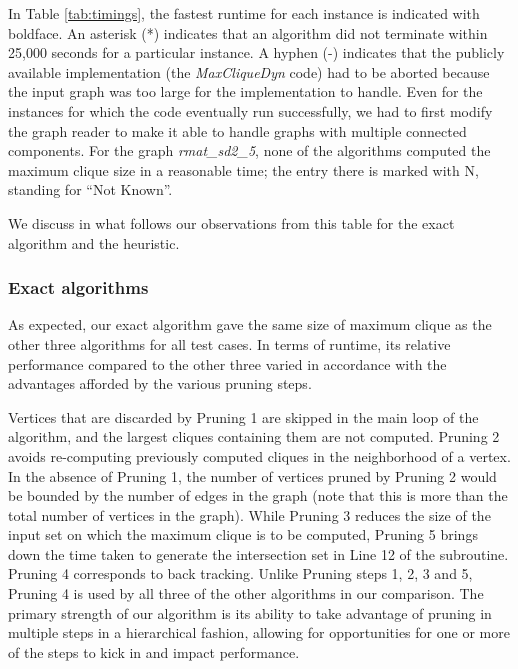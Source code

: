 In Table \ref{tab:timings}, the fastest runtime for each instance is indicated with boldface. 
An asterisk (*) indicates that an algorithm did not terminate within 25,000 seconds for a particular
instance. A hyphen (-) indicates that the publicly available implementation 
(the {\it MaxCliqueDyn} code) had to be aborted because the input graph was too large 
for the implementation to handle. Even for the instances for which the code
eventually run successfully, we had to first modify 
the graph reader to make it able to handle graphs with multiple connected components.
For the graph {\it rmat\_sd2\_5}, none of the algorithms computed the maximum clique size in 
a reasonable time; the entry there is marked with N, standing for  ``Not Known''.

We discuss in what follows our observations from this table
for the exact algorithm and the heuristic.

\subsubsection{Exact algorithms}
\label{sec:exp-exact}

As expected, our exact algorithm gave the same size of maximum clique as the other
three algorithms for all test cases. 
In terms of runtime,  its relative performance compared to the other three varied
in accordance with the advantages afforded by the various pruning steps.  




Vertices that are discarded by Pruning 1 are skipped in the main loop of the algorithm, and the largest cliques containing them are not computed. Pruning 2 avoids re-computing previously computed cliques in the neighborhood of a vertex. In the absence of Pruning 1, the number of vertices pruned by Pruning 2 would be bounded by the number of edges in the graph (note that this is more than the total number of vertices in the graph). While Pruning 3 reduces the size of the input set on which the maximum clique is to be computed, Pruning 5 brings down the time taken to generate the intersection set in Line 12 of the subroutine. 
Pruning 4 corresponds to back tracking. Unlike Pruning steps 1, 2, 3 and 5, Pruning 4
is used  by all three of the other algorithms in our comparison. The primary strength of our algorithm is its ability to take advantage of pruning in multiple steps in a hierarchical fashion, allowing for opportunities for one or more of the steps to kick in and impact performance.

